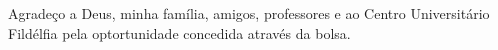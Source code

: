 \begin{agradecimentos}

Agradeço a Deus, minha família, amigos, professores e ao Centro Universitário Fildélfia pela optortunidade concedida através da bolsa.
\end{agradecimentos}
